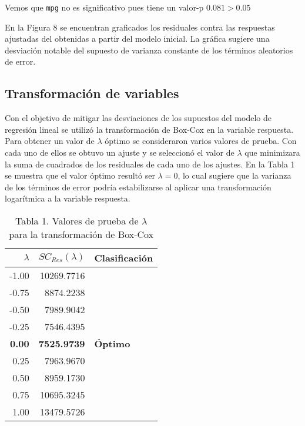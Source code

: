 \documentclass[11pt]{article}
\begin{document}
    Vemos que \texttt{mpg} no es significativo pues tiene un valor-p
\(0.081 > 0.05\)

    
    \begin{center}
    \end{center}
    
    
    En la Figura 8 se encuentran graficados los residuales contra las
respuestas ajustadas del obtenidas a partir del modelo inicial. La
gráfica sugiere una desviación notable del supuesto de varianza
constante de los términos aleatorios de error.

    \hypertarget{transformaciuxf3n-de-variables}{%
\subsection{Transformación de
variables}\label{transformaciuxf3n-de-variables}}

    Con el objetivo de mitigar las desviaciones de los supuestos del modelo
de regresión lineal se utilizó la transformación de Box-Cox en la
variable respuesta. Para obtener un valor de \(\lambda\) óptimo se
consideraron varios valores de prueba. Con cada uno de ellos se obtuvo
un ajuste y se seleccionó el valor de \(\lambda\) que minimizara la suma
de cuadrados de los residuales de cada uno de los ajustes. En la Tabla 1
se muestra que el valor óptimo resultó ser \(\lambda = 0\), lo cual
sugiere que la varianza de los términos de error podría estabilizarse al
aplicar una transformación logarítmica a la variable respuesta.

\begin{table}[!h]
    \centering
    \begin{tabular}{rrl}
        \toprule
        $\lambda$ &  $SC_{Res}(\lambda)$ & Clasificación \\
        \midrule
        -1.00 &             10269.7716 &               \\
        -0.75 &              8874.2238 &               \\
        -0.50 &              7989.9042 &               \\
        -0.25 &              7546.4395 &               \\
        \textbf{0.00} &     \textbf{7525.9739} &        \textbf{Óptimo}\\
        0.25 &              7963.9670 &               \\
        0.50 &              8959.1730 &               \\
        0.75 &             10695.3245 &               \\
        1.00 &             13479.5726 &               \\
        \bottomrule
    \end{tabular}
    \caption*{Tabla 1. Valores de prueba de $\lambda$ para la transformación de Box-Cox}
\end{table}
    
\end{document}
